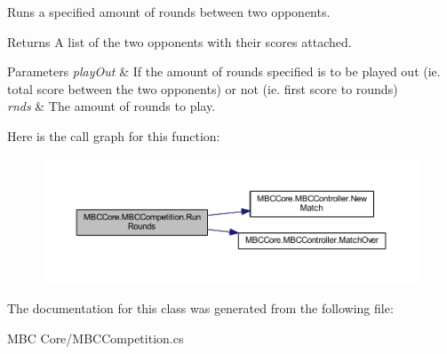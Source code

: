 Runs a specified amount of rounds between two opponents.

\begin{DoxyReturn}{Returns}
A list of the two opponents with their scores attached.
\end{DoxyReturn}

\begin{DoxyParams}{Parameters}
{\em play\-Out} & If the amount of rounds specified is to be played out (ie. total score between the two opponents) or not (ie. first score to rounds)\\
\hline
{\em rnds} & The amount of rounds to play.\\
\hline
\end{DoxyParams}


Here is the call graph for this function\-:\nopagebreak
\begin{figure}[H]
\begin{center}
\leavevmode
\includegraphics[width=350pt]{class_m_b_c_core_1_1_m_b_c_competition_aaf6a747ab60fda23d5e1d67943fc28d9_cgraph}
\end{center}
\end{figure}




The documentation for this class was generated from the following file\-:\begin{DoxyCompactItemize}
\item 
M\-B\-C Core/M\-B\-C\-Competition.\-cs\end{DoxyCompactItemize}
